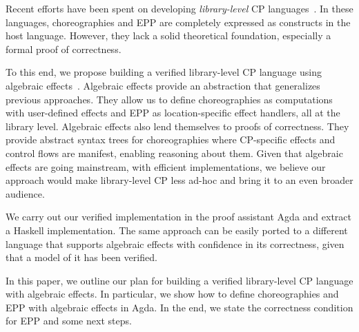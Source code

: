 Recent efforts have been spent on developing \emph{library-level} CP languages~\citep{shen-2023, kashiwa-2023}.
%
In these languages, choreographies and EPP are completely expressed as constructs in the host language.
%
However, they lack a solid theoretical foundation, especially a formal proof of correctness.

To this end, we propose building a verified library-level CP language using algebraic effects~\citep{plotkin-2003, plotkin-2013}.
%
Algebraic effects provide an abstraction that generalizes previous approaches.
%
They allow us to define choreographies as computations with user-defined effects and EPP as location-specific effect handlers, all at the library level.
%
Algebraic effects also lend themselves to proofs of correctness.
%
They provide abstract syntax trees for choreographies where CP-specific effects and control flows are manifest, enabling reasoning about them.
%
Given that algebraic effects are going mainstream, with efficient implementations, we believe our approach would make library-level CP less ad-hoc and bring it to an even broader audience.

We carry out our verified implementation in the proof assistant Agda and extract a Haskell implementation.
%
The same approach can be easily ported to a different language that supports algebraic effects with confidence in its correctness, given that a model of it has been verified.

In this paper, we outline our plan for building a verified library-level CP language with algebraic effects.
%
In particular, we show how to define choreographies and EPP with algebraic effects in Agda.
%
In the end, we state the correctness condition for EPP and some next steps.
